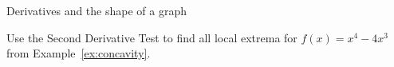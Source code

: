 \documentclass[../main.tex]{subfiles}
\begin{document}
\begin{lesson}{Derivatives and the shape of a graph}
\begin{mdframed}[style=withref-compact]
  \end{mdframed}

  \begin{example}
    Use the Second Derivative Test to find all local extrema for \(f(x) = x^{4} - 4x^{3}\) from Example~\ref{ex:concavity}.
  \end{example}
  \vfill
\end{lesson}
\end{document}
